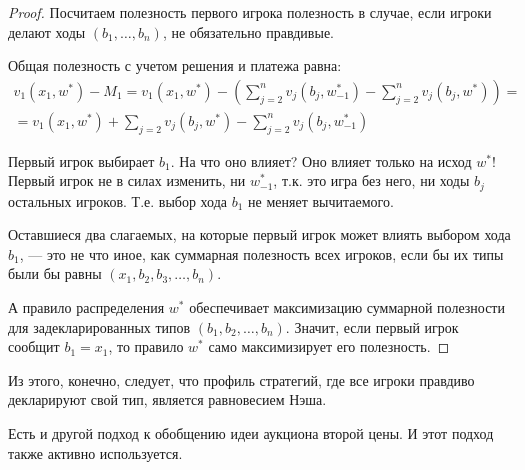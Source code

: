 \begin{proof}
Посчитаем полезность первого игрока полезность в случае, если игроки делают ходы $ (b_{1},\ldots,b_{n}) $, не обязательно правдивые.

Общая полезность с учетом решения и платежа равна:
\begin{multline}
v_{1}(x_{1},w^{*})-M_{1}=v_{1}(x_{1},w^{*})-\left(\sum_{j=2}^{n}v_{j}(b_{j},w_{-1}^{*})-\sum_{j=2}^{n}v_{j}(b_{j},w^{*})\right)=\\
=v_{1}(x_{1},w^{*})+\sum_{j=2}v_{j}(b_{j},w^{*})-\sum_{j=2}^{n}v_{j}(b_{j},w_{-1}^{*})
\end{multline}

Первый игрок выбирает $ b_{1} $. На что оно влияет? Оно влияет только на исход $ w^{*} $! Первый игрок не в силах изменить, ни  $ w_{-1}^{*} $, т.к. это игра без него, ни ходы $ b_{j} $ остальных игроков. Т.е. выбор хода $ b_{1} $ не меняет вычитаемого.

Оставшиеся два слагаемых, на которые первый игрок может влиять выбором хода $ b_{1} $, --- это не что иное, как суммарная полезность всех игроков, если бы их типы были бы равны $ (x_{1},b_{2},b_{3},\ldots,b_{n}) $. 

А правило распределения $ w^{*} $ обеспечивает максимизацию суммарной полезности для задекларированных типов $ (b_{1},b_{2},\ldots,b_{n}) $. Значит, если первый игрок сообщит $ b_{1}=x_{1} $, то правило $ w^{*} $ само максимизирует его полезность. 

\end{proof}

Из этого, конечно, следует, что профиль стратегий, где все игроки правдиво декларируют свой тип, является равновесием Нэша.







Есть и другой подход к обобщению идеи аукциона второй цены. И этот подход также активно используется.

